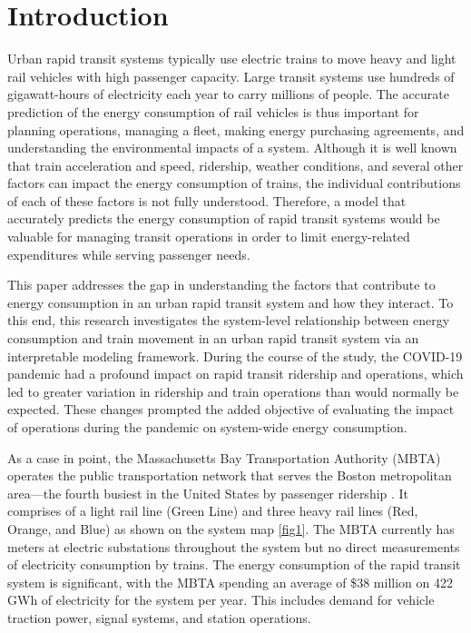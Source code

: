\documentclass[times]{TRR}
\begin{document}
\section{Introduction}
Urban rapid transit systems typically use electric trains to move heavy and light rail vehicles with high passenger capacity.  Large transit systems use hundreds of gigawatt-hours of electricity each year to carry millions of people.  The accurate prediction of the energy consumption of rail vehicles is thus important for planning operations, managing a fleet, making energy purchasing agreements, and understanding the environmental impacts of a system. Although it is well known that train acceleration and speed, ridership, weather conditions, and several other factors can impact the energy consumption of trains, the individual contributions of each of these factors is not fully understood.  Therefore, a model that accurately predicts the energy consumption of rapid transit systems would be valuable for managing transit operations in order to limit energy-related expenditures while serving passenger needs.


This paper addresses the gap in understanding the factors that contribute to energy consumption in an urban rapid transit system and how they interact. To this end, this research investigates the system-level relationship between energy consumption and train movement in an urban rapid transit system via an interpretable modeling framework.
During the course of the study, the COVID-19 pandemic had a profound impact on rapid transit ridership and operations, which led to greater variation in ridership and train operations than would normally be expected. These changes prompted the added objective of evaluating the impact of operations during the pandemic on system-wide energy consumption.

As a case in point, the Massachusetts Bay Transportation Authority (MBTA) operates the public transportation network that serves the Boston metropolitan area---the fourth busiest in the United States by passenger ridership \cite{aptaadmin2021ridership}. It comprises of a light rail line (Green Line) and three heavy rail lines (Red, Orange, and Blue) as shown on the system map \autoref{fig1}.  The MBTA currently has meters at electric substations throughout the system but no direct measurements of electricity consumption by trains. The energy consumption of the rapid transit system is significant, with the MBTA spending an average of \$38 million on 422 GWh of electricity for the system per year. This includes demand for vehicle traction power, signal systems, and station operations. 
\end{document}
